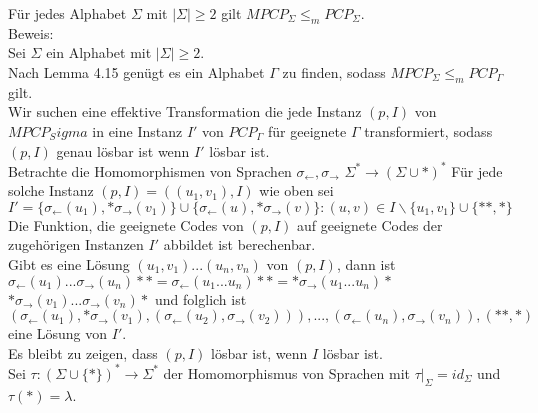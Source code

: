 \begin{lemma}{}
    Für jedes Alphabet $\Sigma$ mit $|\Sigma| \geq 2$ gilt $MPCP_\Sigma \leq_m PCP_\Sigma$. \\

    Beweis: \\
    Sei $\Sigma$ ein Alphabet mit $|\Sigma| \geq 2$. \\
    Nach Lemma 4.15 genügt es ein Alphabet $\Gamma$ zu finden, sodass $MPCP_\Sigma \leq_m PCP_\Gamma$ gilt. \\

    Wir suchen eine effektive Transformation die jede Instanz $(p, I)$ von $MPCP_Sigma$ in eine Instanz
    $I'$ von $PCP_\Gamma$ für geeignete $\Gamma$ transformiert, sodass $(p,I)$ genau lösbar ist wenn $I'$ lösbar ist. \\

    Betrachte die Homomorphismen von Sprachen $\sigma_{\leftarrow}, \sigma_{\rightarrow}$ $\Sigma^* \rightarrow (\Sigma \cup{*})^*$
    Für jede solche Instanz $(p,I) = ((u_1,v_1), I)$ wie oben sei $I'=\{\sigma_{\leftarrow}(u_1),*\sigma_{\rightarrow}(v_1)\}
    \cup \{\sigma_{\leftarrow}(u),*\sigma_{\rightarrow}(v)\} : (u,v) \in I \backslash\{u_1,v_1\} \cup \{**,*\}$ \\
    
    Die Funktion, die geeignete Codes von $(p,I)$ auf geeignete Codes der zugehörigen Instanzen $I'$ abbildet ist berechenbar. \\

    Gibt es eine Lösung $(u_1,v_1)...(u_n,v_n)$ von $(p,I)$, dann ist \\
    $\sigma_\leftarrow(u_1)...\sigma_\rightarrow(u_n)** = \sigma_\leftarrow(u_1...u_n)** = *\sigma_\rightarrow(u_1...u_n)*$ \\
    $*\sigma_\rightarrow(v_1)...\sigma_\rightarrow(v_n)*$ und folglich ist \\
    $(\sigma_\leftarrow(u_1),*\sigma_\rightarrow(v_1),(\sigma_\leftarrow(u_2),\sigma_\rightarrow(v_2))),...,
    (\sigma_\leftarrow(u_n),\sigma_\rightarrow(v_n)),(**,*)$ eine Lösung von $I'$. \\

    Es bleibt zu zeigen, dass $(p,I)$ lösbar ist, wenn $I$ lösbar ist. \\

    Sei $\tau : (\Sigma \cup \{*\})^* \rightarrow \Sigma^*$ der Homomorphismus von Sprachen mit $\tau|_\Sigma = id_\Sigma$
    und $\tau(*) = \lambda$. \\


\end{lemma}
